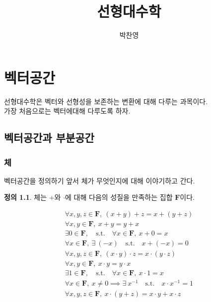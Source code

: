 \documentclass[12pt]{book}
\author{박찬영}
\title{선형대수학}
\newcommand{\0}{\mathbf{0}}
\newcommand{\F}{\mathbf{F}}
\theoremstyle{definition}
\newtheorem*{defi}{정의}
\begin{document}
\maketitle
\tableofcontents
\chapter{벡터공간}
선형대수학은 벡터와 선형성을 보존하는 변환에 대해 다루는 과목이다.\\
가장 처음으로는 벡터에대해 다루도록 하자.
\section{벡터공간과 부분공간}
\subsection{체}
벡터공간을 정의하기 앞서 체가 무엇인지에 대해 이야기하고 간다.\\
\begin{tcolorbox}[title=체]
    \begin{defi}
체는 +와 $\cdot$에 대해 다음의 성질을 만족하는 집합 $\F$이다.

\begin{align*}
    \forall x,y,z \in \mathbf{F},\ (x + y)+z=x+(y+z) \tag{체 1} \\
    \forall x,y \in \mathbf{F},\ x+y=y+x \tag{체 2} \\
    \exists 0 \in \mathbf{F}, \quad \text{s.t.} \quad \forall x \in \mathbf{F}, \ x +0=x \tag{체 3}\\ 
    \forall x \in \mathbf{F}, \ \exists \ (-x) \quad \text{s.t.} \quad x+(-x)=0 \tag{체 4} \\
    \forall x,y,z \in \mathbf{F},\ (x \cdot y) \cdot z=x\cdot(y\cdot z) \tag{체 5} \\
    \forall x,y \in \mathbf{F},\ x\cdot y=y\cdot x \tag{체 6} \\
    \exists 1 \in \mathbf{F}, \quad \text{s.t.} \quad \forall x \in \mathbf{F}, \ x \cdot 1 =x \tag{체 7}\\ 
    \forall x \in \mathbf{F}, \ x\neq 0 \implies \exists \ x^{-1} \quad \text{s.t.} \quad x\cdot x^{-1}=1 \tag{체 8} \\
    \forall x,y,z \in \mathbf{F}, \ x\cdot (y+z) = x\cdot y + x\cdot z \tag{체 9}
\end{align*}
\end{defi}
\end{tcolorbox}
\end{document}
